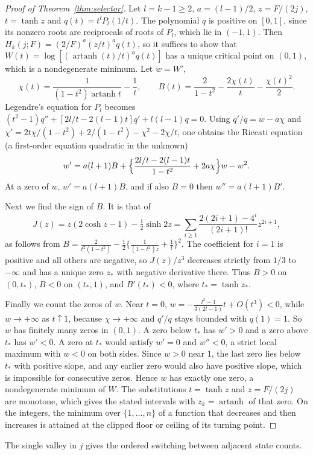 \documentclass[11pt]{article}
\theoremstyle{remark}
\begin{document}
\begin{proof}[Proof of Theorem~\ref{thm:selector}]
Let $l=k-1\ge2$, $a=(l-1)/2$, $z=F/(2j)$, $t=\tanh z$ and
$q(t)=t^lP_l(1/t)$. The polynomial $q$ is positive on $[0,1]$, since its
nonzero roots are reciprocals of roots of $P_l$, which lie in $(-1,1)$.
Then $H_k(j;F)=(2/F)^a(z/t)^aq(t)$, so it suffices to show that
$W(t)=\log[(\operatorname{artanh}(t)/t)^aq(t)]$ has a unique critical point
on $(0,1)$, which is a nondegenerate minimum. Let $w=W'$,
\[
\chi(t)=\frac1{(1-t^2)\operatorname{artanh}t}-\frac1t,\qquad
B(t)=\frac2{1-t^2}-\frac{2\chi(t)}t-\frac{\chi(t)^2}2.
\]
Legendre's equation for $P_l$ becomes
$(t^2-1)q''+[2l/t-2(l-1)t]q'+l(l-1)q=0$. Using $q'/q=w-a\chi$ and
$\chi'=2t\chi/(1-t^2)+2/(1-t^2)-\chi^2-2\chi/t$, one obtains the Riccati
equation (a first-order equation quadratic in the unknown)
\[
w'=a(l+1)B+\Bigl\{\frac{2l/t-2(l-1)t}{1-t^2}+2a\chi\Bigr\}w-w^2.
\]
At a zero of $w$, $w'=a(l+1)B$, and if also $B=0$ then $w''=a(l+1)B'$.

Next we find the sign of $B$. It is that of
\[
J(z)=z(2\cosh z-1)-\tfrac12\sinh2z=\sum_{i\ge1}
\frac{2(2i+1)-4^i}{(2i+1)!}z^{2i+1},
\]
as follows from
$B=\frac2{t^2(1-t^2)}-\frac12\bigl\{\frac1{(1-t^2)z}+\frac1t\bigr\}^2$.
The coefficient for $i=1$ is positive and all others are negative, so
$J(z)/z^3$ decreases strictly from $1/3$ to $-\infty$ and has a unique zero
$z_*$ with negative derivative there. Thus $B>0$ on $(0,t_*)$, $B<0$ on
$(t_*,1)$, and $B'(t_*)<0$, where $t_*=\tanh z_*$.

Finally we count the zeros of $w$. Near $t=0$,
$w=-\frac{l^2-1}{3(2l-1)}t+O(t^3)<0$, while $w\to+\infty$ as $t\uparrow1$,
because $\chi\to+\infty$ and $q'/q$ stays bounded with $q(1)=1$. So $w$ has
finitely many zeros in $(0,1)$. A zero below $t_*$ has $w'>0$ and a zero
above $t_*$ has $w'<0$. A zero at $t_*$ would satisfy $w'=0$ and $w''<0$, a
strict local maximum with $w<0$ on both sides. Since $w>0$ near $1$, the
last zero lies below $t_*$ with positive slope, and any earlier zero would
also have positive slope, which is impossible for consecutive zeros. Hence
$w$ has exactly one zero, a nondegenerate minimum of $W$. The substitutions
$t=\tanh z$ and $z=F/(2j)$ are monotone, which gives the stated intervals
with $z_k=\operatorname{artanh}$ of that zero. On the integers, the minimum
over $\{1,\dots,n\}$ of a function that decreases and then increases is
attained at the clipped floor or ceiling of its turning point.
\end{proof}

The single valley in $j$ gives the ordered switching between adjacent state
counts.
\end{document}
